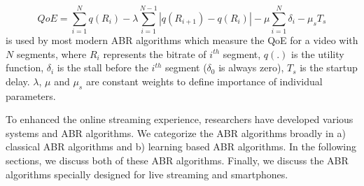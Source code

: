 \begin{equation}
\label{eqn:QoE}
QoE = \sum_{i=1}^N q(R_i) - \lambda\sum_{i=1}^{N-1}\left|q(R_{i+1})-q(R_i)\right| - \mu\sum_{i=1}^N \delta_i - \mu_s T_s
\end{equation}
\eqn{\ref{eqn:QoE}} is used by most modern \ac{ABR} algorithms which measure the \ac{QoE} for a video with $N$ segments, where $R_i$ represents the bitrate of $i^{th}$ segment, $q(.)$ is the utility function, $\delta_i$ is the stall before the $i^{th}$ segment ($\delta_0$ is always zero), $T_s$ is the startup delay. $\lambda$, $\mu$ and $\mu_s$ are constant weights to define importance of individual parameters.

To enhanced the online streaming experience, researchers have developed various systems and \ac{ABR} algorithms. We categorize the \ac{ABR} algorithms broadly in a) classical \ac{ABR} algorithms and b) learning based \ac{ABR} algorithms. In the following sections, we discuss both of these \ac{ABR} algorithms. Finally, we discuss the \ac{ABR} algorithms specially designed for live streaming and smartphones.

